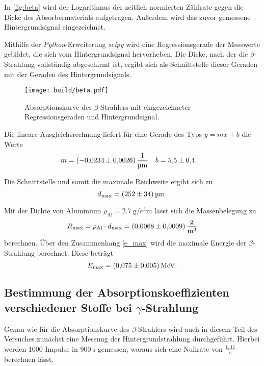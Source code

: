 In \autoref{fig:beta} wird der Logarithmus der zeitlich normierten Zählrate gegen die Dicke des Absorbermaterials 
aufgetragen. Außerdem wird das zuvor gemessene Hintergrundsignal eingezeichnet.

Mithilfe der \textit{Python}-Erweiterung \textit{scipy} \cite{scipy} wird eine Regressionsgerade der Messwerte gebildet, die sich
vom Hintergrundsignal hervorheben.
Die Dicke, nach der die $\beta$-Strahlung vollständig abgeschirmt ist, ergibt sich als Schnittstelle dieser Geraden mit der
Geraden des Hintergrundsignals.

\begin{figure}[H]
    \centering
    \texttt{[image: build/beta.pdf]}
    \caption{Absorptionskurve des $\beta$-Strahlers mit eingezeichneter Regressionsgeraden und Hintergrundsignal.}
    \label{fig:beta}
\end{figure}

Die lineare Ausgleichsrechnung liefert für eine Gerade des Typs $y = mx + b$ die Werte
\begin{align*}
    m &= \qty{-0.0234+-0.0026}{\per\micro\metre} & b &= \num{5.5+-0.4}.
\end{align*}

Die Schnittstelle und somit die maximale Reichweite ergibt sich zu
\begin{equation*}
    d_{\text{max}} = \qty{252+-34}{\micro\metre}.
\end{equation*}

Mit der Dichte von Aluminium $\rho_{\text{Al}} = \qty{2.7}{\gram\per\cubic\centi\metre}$ \cite{czichos} lässt sich die Massenbelegung
zu
\begin{equation*}
    R_{\text{max}} = \rho_{\text{Al}} \cdot d_{\text{max}} = \qty{0.0068+-0.0009}{\gram\per\metre\squared}
\end{equation*}
berechnen.
Über den Zusammenhang \eqref{e_max} wird die maximale Energie der $\beta$-Strahlung berechnet. Diese beträgt
\begin{equation*}
    E_{\text{max}} = \qty{0.075+-0.005}{\mega\electronvolt}.
\end{equation*}

\subsection{\texorpdfstring{Bestimmung der Absorptionskoeffizienten verschiedener Stoffe bei $\gamma$-Strahlung}
{Bestimmung der Absorptionskoeffizienten verschiedener Stoffe bei Gamma-Strahlung}}
Genau wie für die Absorptionskurve des $\beta$-Strahlers wird auch in diesem Teil des Versuches zunächst eine Messung
der Hintergrundstrahlung durchgeführt. Hierbei werden 1000 Impulse in $\qty{900}{\second}$ gemessen, woraus sich eine 
Nullrate von $\frac{1,11}{\unit{\second}}$ berechnen lässt.


